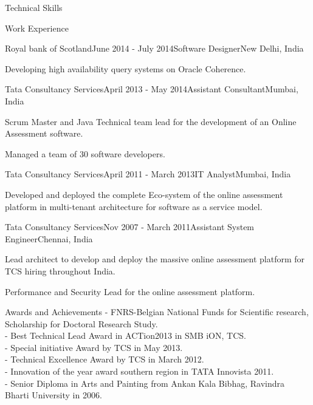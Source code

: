 \documentclass{resume} %
\begin{document}
\begin{rSection}{Technical Skills}
\begin{rSection}{Work Experience}
\begin{rSubsection}{Royal bank of Scotland}{June 2014 - July 2014}{Software Designer}{New Delhi, India}
\item Developing high availability query systems on Oracle Coherence.
\end{rSubsection}
\begin{rSubsection}{Tata Consultancy Services}{April 2013 - May 2014}{Assistant Consultant}{Mumbai, India}
\item Scrum Master and Java Technical team lead for the development of an Online Assessment software. 
\item Managed a team of $30$ software developers.  
\end{rSubsection}
\begin{rSubsection}{Tata Consultancy Services}{April 2011 - March 2013}{IT Analyst}{Mumbai, India}
\item Developed and deployed the complete Eco-system of the online assessment platform in multi-tenant architecture for software as a service model.
\end{rSubsection}
\begin{rSubsection}{Tata Consultancy Services}{Nov 2007 - March 2011}{Assistant System Engineer}{Chennai, India}
\item Lead architect to develop and deploy the massive online assessment platform for TCS hiring throughout India.
\item Performance and Security Lead for the online assessment platform.
\end{rSubsection}
\end{rSection}


\end{rSection}
\begin{rSection}{Awards and Achievements}
- FNRS-Belgian National Funds for Scientific research, Scholarship for Doctoral Research Study.\\
- Best Technical Lead Award in ACTion2013 in SMB iON, TCS. \\
- Special initiative Award by TCS in May 2013.\\
- Technical Excellence Award by TCS in March 2012.\\
- Innovation of the year award southern region in TATA Innovista 2011.\\
- Senior Diploma in Arts and Painting from Ankan Kala Bibhag, Ravindra Bharti University in 2006.\\
\end{rSection}
\end{document}
